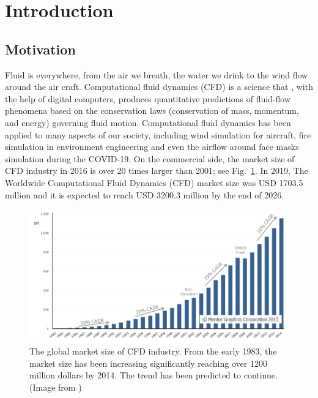 \section{Introduction}

\subsection{Motivation}


Fluid is everywhere, from the air we breath, the water we drink to the wind flow around the air craft. Computational fluid dynamics (CFD) is a science that \cite{thelbmbible}, with the help of digital computers, produces quantitative predictions of fluid-flow phenomena based on the conservation laws (conservation of mass, momentum, and energy) governing fluid motion. Computational fluid dynamics has been applied to many aspects of our society, including wind simulation for aircraft, fire simulation in environment engineering and even the airflow around face masks simulation during the COVID-19. On the commercial side, the market size of CFD industry in 2016 is over 20 times larger than 2001; see Fig.~\ref{fig:cfd_market}. In 2019, The Worldwide Computational Fluid Dynamics (CFD) market size was USD 1703.5 million and it is expected to reach USD 3200.3 million by the end of 2026\cite{market_cfd}.\\

\begin{figure}[htbp]
    \centering
    \includegraphics[width=1\textwidth]{figures/CFD_market.jpg}
    \caption{The global market size of CFD industry. From the early 1983, the market size has been increasing significantly reaching over 1200 million dollars by 2014. The trend has been predicted to continue. (Image from \cite{market_cfd})}
    \label{fig:cfd_market}
\end{figure}

